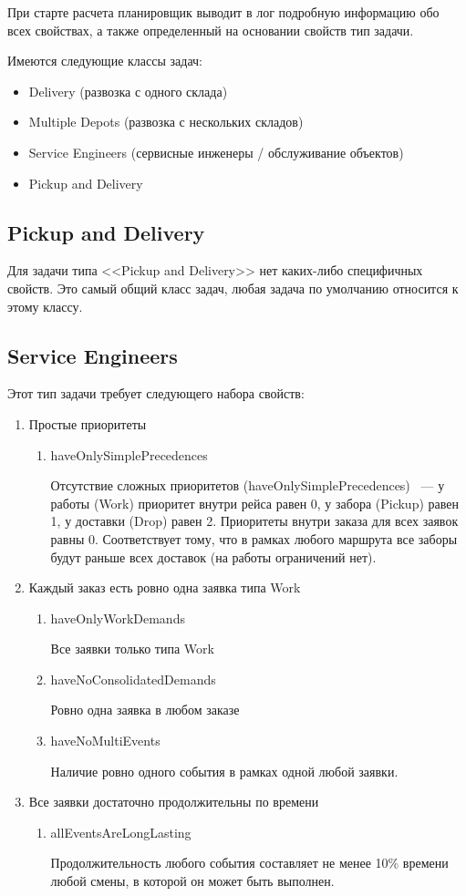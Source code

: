 При старте расчета планировщик выводит в лог подробную информацию обо всех свойствах, а также определенный на основании свойств тип задачи.

Имеются следующие классы задач:

\begin{itemize}
\item Delivery (развозка с одного склада)
\item Multiple Depots (развозка с нескольких складов)
\item Service Engineers (сервисные инженеры / обслуживание объектов)
\item Pickup and Delivery
\end{itemize}

\subsection{Pickup and Delivery}

Для задачи типа <<Pickup and Delivery>> нет каких-либо специфичных свойств. Это самый общий класс задач, любая задача по умолчанию относится к этому классу.

\subsection{Service Engineers}

Этот тип задачи требует следующего набора свойств:

\begin{enumerate}
\item Простые приоритеты
\begin{enumerate}
\item haveOnlySimplePrecedences	

Отсутствие сложных приоритетов (haveOnlySimplePrecedences) ~--- у работы (Work) приоритет внутри рейса равен 0, у забора (Pickup) равен 1, у доставки (Drop) равен 2. Приоритеты внутри заказа для всех заявок равны 0. Соответствует тому, что в рамках любого маршрута все заборы будут раньше всех доставок (на работы ограничений нет).
\end{enumerate}
\item Каждый заказ есть ровно одна заявка типа Work
\begin{enumerate}
	\item haveOnlyWorkDemands
	
	Все заявки только типа Work
	\item haveNoConsolidatedDemands
	
	Ровно одна заявка в любом заказе 
	\item haveNoMultiEvents	
	
	Наличие ровно одного события в рамках одной любой заявки.
\end{enumerate}
\item Все заявки достаточно продолжительны по времени
\begin{enumerate}
	\item allEventsAreLongLasting
	
	Продолжительность любого события составляет не менее 10\% времени любой смены, в которой он может быть выполнен.
	\end{enumerate}
\end{enumerate}

